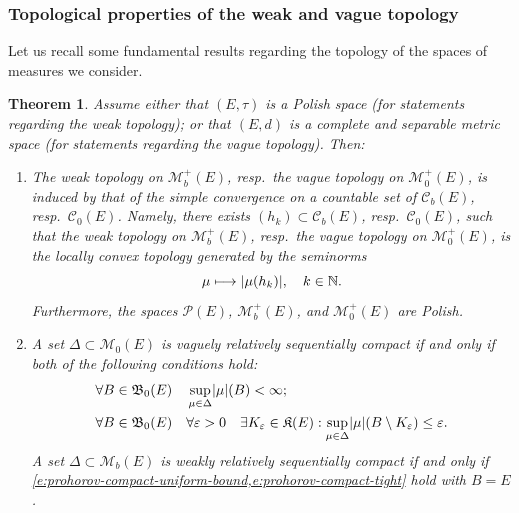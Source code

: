\documentclass[10pt]{amsart}
\newcommand\mto{\mathchoice{\longmapsto}{\mapsto}{\mapsto}{\mapsto}}
\newtheorem{theorem}{Theorem}[section]
\theoremstyle{definition}
\theoremstyle{remark}
\DeclarePairedDelimiter{\abs}{\lvert}{\rvert}
\begin{document}
\subsubsection{Topological properties of the weak and vague topology}
Let us recall some fundamental results regarding the topology of the spaces of measures we consider.

\begin{theorem}\label{t:prohorov}
Assume either that $(E, \tau)$ is a Polish space (for statements regarding the weak topology); or that $(E, d)$ is a complete and separable metric space (for statements regarding the vague topology).
Then:
\begin{enumerate}[$(\rm i)$, wide]
\item\label{i:prohorov-polish}
The weak topology on $\mathscr{M}_{b}^{+}(E)$, resp.\ the vague topology on $\mathscr{M}_{0}^{+}(E)$, is induced by that of the simple convergence on a countable set of $\mathscr{C}_{b}(E)$, resp.\ $\mathscr{C}_{0}(E)$.
Namely, there exists $(h_{k}) \subset \mathscr{C}_{b}(E)$, resp.\ $\mathscr{C}_{0}(E)$, such that the weak topology on $\mathscr{M}_{b}^{+}(E)$, resp.\ the vague topology on $\mathscr{M}_{0}^{+}(E)$, is the locally convex topology generated by the seminorms
\begin{equation*}
\mu \mto \abs{\mu(h_{k})}, \quad k \in \mathbb{N}.
\end{equation*}
Furthermore, the spaces $\mathscr{P}(E)$, $\mathscr{M}_{b}^{+}(E)$, and $\mathscr{M}^{+}_{0}(E)$ are Polish.
\item\label{i:prohorov-compact}
A set $\Delta \subset \mathscr{M}_{0}(E)$ is vaguely relatively sequentially compact if and only if both of the following conditions hold:
\begin{subequations}\label{e:prohorov-compact}
\begin{align}
& \label{e:prohorov-compact-uniform-bound} \forall B \in \mathfrak{B}_{0}(E)\quad \sup_{\mu \in \Delta} \abs{\mu}(B) < \infty; \\
& \label{e:prohorov-compact-tight} \forall B \in \mathfrak{B}_{0}(E) \quad \forall \varepsilon > 0 \quad \exists K_{\varepsilon} \in \mathfrak{K}(E) : \sup_{\mu \in \Delta} \abs{\mu}(B \setminus K_{\varepsilon}) \leq \varepsilon.
\end{align}
\end{subequations}
A set $\Delta \subset \mathscr{M}_{b}(E)$ is weakly relatively sequentially compact if and only if \cref{e:prohorov-compact-uniform-bound,e:prohorov-compact-tight} hold with $B = E$.
\end{enumerate}
\end{theorem}
\end{document}
